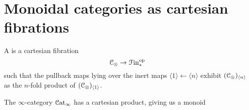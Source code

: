 \documentclass[main.tex]{subfiles}
\begin{document}
\section{Monoidal categories as cartesian fibrations}
\label{sec:monoidal_categories_as_cartesian_fibrations}

\begin{definition}
  \label{def:contravariantly_presented_monoidal_category}
  A  is a cartesian fibration
  \begin{equation*}
    \mathcal{C}_{\otimes} \to \mathcal{F}\mathrm{in}_{*}^{\mathrm{op}}
  \end{equation*}
  such that the pullback maps lying over the inert maps $\langle 1 \rangle \leftarrow \langle n \rangle$ exhibit $(\mathcal{C}_{\otimes})_{\langle n \rangle}$ as the $n$-fold product of $(\mathcal{C}_{\otimes})_{\langle 1 \rangle}$.
\end{definition}

\begin{example}
  The $\infty$-category $\mathcal{C}\mathrm{at}_{\infty}$ has a cartesian product, giving us a monoid
\end{example}
\end{document}
